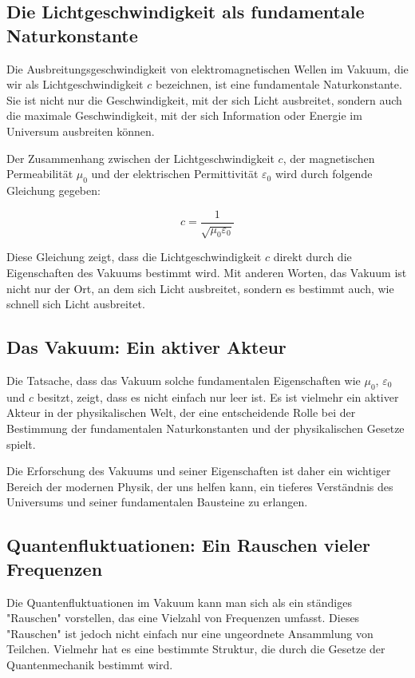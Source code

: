 \documentclass{article}
\begin{document}
\subsection{Die Lichtgeschwindigkeit als fundamentale Naturkonstante}

Die Ausbreitungsgeschwindigkeit von elektromagnetischen Wellen im Vakuum, die wir als Lichtgeschwindigkeit $c$ bezeichnen, ist eine fundamentale Naturkonstante. Sie ist nicht nur die Geschwindigkeit, mit der sich Licht ausbreitet, sondern auch die maximale Geschwindigkeit, mit der sich Information oder Energie im Universum ausbreiten können.

Der Zusammenhang zwischen der Lichtgeschwindigkeit $c$, der magnetischen Permeabilität $\mu_0$ und der elektrischen Permittivität $\varepsilon_0$ wird durch folgende Gleichung gegeben:

\begin{equation}
	c = \frac{1}{\sqrt{\mu_0 \varepsilon_0}}
\end{equation}

Diese Gleichung zeigt, dass die Lichtgeschwindigkeit $c$ direkt durch die Eigenschaften des Vakuums bestimmt wird. Mit anderen Worten, das Vakuum ist nicht nur der Ort, an dem sich Licht ausbreitet, sondern es bestimmt auch, wie schnell sich Licht ausbreitet.

\subsection{Das Vakuum: Ein aktiver Akteur}

Die Tatsache, dass das Vakuum solche fundamentalen Eigenschaften wie $\mu_0$, $\varepsilon_0$ und $c$ besitzt, zeigt, dass es nicht einfach nur leer ist. Es ist vielmehr ein aktiver Akteur in der physikalischen Welt, der eine entscheidende Rolle bei der Bestimmung der fundamentalen Naturkonstanten und der physikalischen Gesetze spielt.

Die Erforschung des Vakuums und seiner Eigenschaften ist daher ein wichtiger Bereich der modernen Physik, der uns helfen kann, ein tieferes Verständnis des Universums und seiner fundamentalen Bausteine zu erlangen.
\subsection{Quantenfluktuationen: Ein Rauschen vieler Frequenzen}

Die Quantenfluktuationen im Vakuum kann man sich als ein ständiges "Rauschen" vorstellen, das eine Vielzahl von Frequenzen umfasst. Dieses "Rauschen" ist jedoch nicht einfach nur eine ungeordnete Ansammlung von Teilchen. Vielmehr hat es eine bestimmte Struktur, die durch die Gesetze der Quantenmechanik bestimmt wird.
\end{document}
